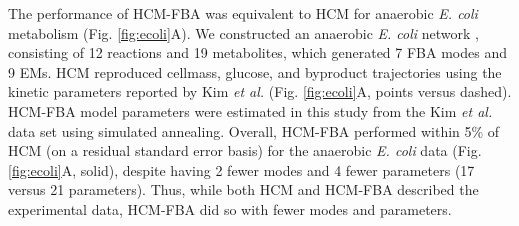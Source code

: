 \documentclass[10pt,twocolumn,twoside,final]{IEEEtran}
\begin{document}

The performance of HCM-FBA was equivalent to HCM for anaerobic \textit{E. coli} metabolism (Fig. \ref{fig:ecoli}A).
We constructed an anaerobic \textit{E. coli} network \cite{2008_kim_varner_ramkrishna_BiotechProg}, consisting of 12 reactions and 19 metabolites, which generated 7 FBA modes and 9 EMs.
HCM reproduced cellmass, glucose, and byproduct trajectories using the kinetic parameters reported by Kim \textit{et al.} \cite{2008_kim_varner_ramkrishna_BiotechProg} (Fig. \ref{fig:ecoli}A, points versus dashed).
HCM-FBA model parameters were estimated in this study from the Kim \textit{et al.} data set using simulated annealing.
Overall, HCM-FBA performed within 5\% of HCM (on a residual standard error basis) for the anaerobic \textit{E. coli} data (Fig. \ref {fig:ecoli}A, solid),
despite having 2 fewer modes and 4 fewer parameters (17 versus 21 parameters).
Thus, while both HCM and HCM-FBA described the experimental data, HCM-FBA did so with fewer modes and parameters.
\end{document}

